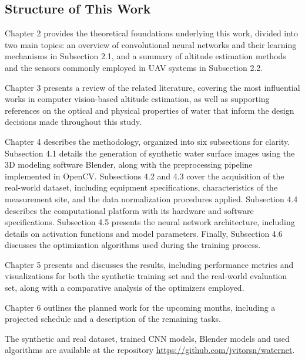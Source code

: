 \subsection{Structure of This Work}

Chapter 2 provides the theoretical foundations underlying this work, divided into two main topics: an overview of convolutional neural networks and their learning mechanisms in Subsection 2.1, and a summary of altitude estimation methods and the sensors commonly employed in UAV systems in Subsection 2.2.

Chapter 3 presents a review of the related literature, covering the most influential works in computer vision-based altitude estimation, as well as supporting references on the optical and physical properties of water that inform the design decisions made throughout this study.

Chapter 4 describes the methodology, organized into six subsections for clarity. Subsection 4.1 details the generation of synthetic water surface images using the 3D modeling software Blender, along with the preprocessing pipeline implemented in OpenCV. Subsections 4.2 and 4.3 cover the acquisition of the real-world dataset, including equipment specifications, characteristics of the measurement site, and the data normalization procedures applied. Subsection 4.4 describes the computational platform with its hardware and software specifications. Subsection 4.5 presents the neural network architecture, including details on activation functions and model parameters. Finally, Subsection 4.6 discusses the optimization algorithms used during the training process.

Chapter 5 presents and discusses the results, including performance metrics and visualizations for both the synthetic training set and the real-world evaluation set, along with a comparative analysis of the optimizers employed.

Chapter 6 outlines the planned work for the upcoming months, including a projected schedule and a description of the remaining tasks.

The synthetic and real dataset, trained CNN models, Blender models and used algorithms are available at the repository \url{https://github.com/jvitorsn/waternet}.